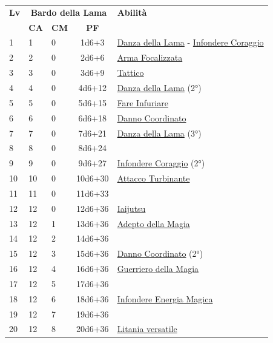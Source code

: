 {\begin{multicols}{2}


\noindent\begin{tabularx}{\linewidth}{p{0.3cm}|p{0.3cm}p{0.3cm}c|X|}
	\toprule
 \rowcolor{gray!20}	\textbf{Lv} & \multicolumn{3}{c|}{\textbf{Bardo della Lama}} & \textbf{Abilità} \\
& \centering\arraybackslash \textbf{CA} & \centering\arraybackslash \textbf{CM} & \centering\arraybackslash \textbf{PF} & \\
	\toprule
	1 &1	& 0	&	1d6+3	&\hyperlink{Danza della Lama}{Danza della Lama} - \hyperlink{Infondere Coraggio}{Infondere Coraggio}\\
 \rowcolor{gray!20}2	&	2	& 0	&	2d6+6	&\hyperlink{Arma Focalizzata}{Arma Focalizzata}\\
	3	&	3	& 0	&	3d6+9	&\hyperlink{Tattico}{Tattico}\\
 \rowcolor{gray!20}4	&	4	& 0	&	4d6+12	&\hyperlink{Danza della Lama}{Danza della Lama} (2°)\\
	5	&	5	& 0	&	5d6+15	&\hyperlink{Fare Infuriare}{Fare Infuriare}\\
 \rowcolor{gray!20}6	&	6	& 0	&	6d6+18	&\hyperlink{Danno Coordinato}{Danno Coordinato}\\
	7	&	7	& 0	&	7d6+21	&\hyperlink{Danza della Lama}{Danza della Lama} (3°)\\
 \rowcolor{gray!20}8	&	8	& 0	&	8d6+24	&\\
	9	&	9	& 0	&	9d6+27	&\hyperlink{Infondere Coraggio}{Infondere Coraggio} (2°)\\
 \rowcolor{gray!20}10	&	10	& 0	&	10d6+30	&\hyperlink{Attacco Turbinante}{Attacco Turbinante}\\
	11	&	11	& 0	&	11d6+33	&\\
 \rowcolor{gray!20}12	&	12	& 0	&	12d6+36	&\hyperlink{Iaijutsu}{Iaijutsu}\\
	13	&	12	& 1	&	13d6+36	&\hyperlink{Adepto della Magia}{Adepto della Magia}\\
 \rowcolor{gray!20}14	&	12	& 2	&	14d6+36	&\\
	15	&	12	& 3	&	15d6+36	&\hyperlink{Danno Coordinato}{Danno Coordinato} (2°)\\
 \rowcolor{gray!20}16	&	12	& 4	&	16d6+36	&\hyperlink{Guerriero della Magia}{Guerriero della Magia}\\
	17	&	12	& 5	&	17d6+36	&\\
 \rowcolor{gray!20}18	&	12	& 6	&	18d6+36	&\hyperlink{Infondere Energia Magica}{Infondere Energia Magica}\\
	19	&	12	& 7	&	19d6+36	&\\
 \rowcolor{gray!20}20	&	12	& 8	&	20d6+36	&\hyperlink{Litania versatile}{Litania versatile}\\
\end{tabularx}


\end{multicols}}
